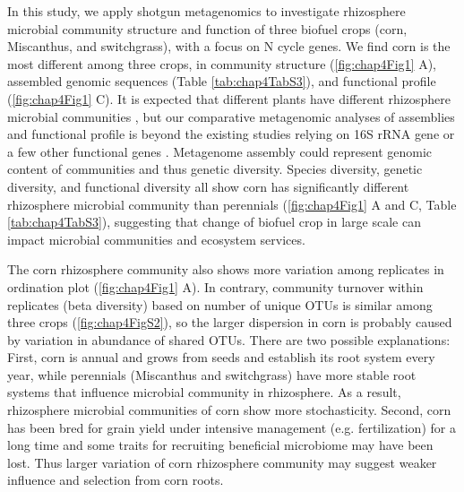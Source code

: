 \documentclass[]{msu-thesis}
\begin{document}
In this study, we apply shotgun metagenomics to investigate rhizosphere microbial community structure and function of three biofuel crops (corn, Miscanthus, and switchgrass), with a focus on N cycle genes. We find corn is the most different among three crops, in community structure (\ref{fig:chap4Fig1} A), assembled genomic sequences (Table \ref{tab:chap4TabS3}), and functional profile (\ref{fig:chap4Fig1} C). It is expected that different plants have different rhizosphere microbial communities \cite{smalla_bulk_2001,mao_changes_2011}, but our comparative metagenomic analyses of assemblies and functional profile is beyond the existing studies relying on 16S rRNA gene or a few other functional genes \cite{mao_changes_2011,mao_impact_2013}. Metagenome assembly could represent genomic content of communities and thus genetic diversity. Species diversity, genetic diversity, and functional diversity all show corn has significantly different rhizosphere microbial community than perennials (\cref{fig:chap4Fig1} A and C, Table \ref{tab:chap4TabS3}), suggesting that change of biofuel crop in large scale can impact microbial communities and ecosystem services.

The corn rhizosphere community also shows more variation among replicates in ordination plot (\cref{fig:chap4Fig1} A). In contrary, community turnover within replicates (beta diversity) based on number of unique OTUs is similar among three crops (\cref{fig:chap4FigS2}), so the larger dispersion in corn is probably caused by variation in abundance of shared OTUs. There are two possible explanations: First, corn is annual and grows from seeds and establish its root system every year, while perennials (Miscanthus and switchgrass) have more stable root systems that influence microbial community in rhizosphere. As a result, rhizosphere microbial communities of corn show more stochasticity. Second, corn has been bred for grain yield under intensive management (e.g. fertilization) for a long time and some traits for recruiting beneficial microbiome may have been lost. Thus larger variation of corn rhizosphere community may suggest weaker influence and selection from corn roots.
\end{document}
